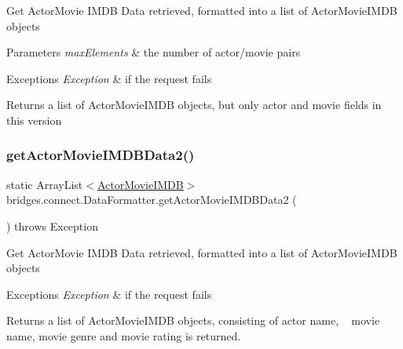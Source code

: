 Get Actor\+Movie I\+M\+DB Data retrieved, formatted into a list of Actor\+Movie\+I\+M\+DB objects


\begin{DoxyParams}{Parameters}
{\em max\+Elements} & the number of actor/movie pairs \\
\hline
\end{DoxyParams}

\begin{DoxyExceptions}{Exceptions}
{\em Exception} & if the request fails\\
\hline
\end{DoxyExceptions}
\begin{DoxyReturn}{Returns}
a list of Actor\+Movie\+I\+M\+DB objects, but only actor and movie fields in this version 
\end{DoxyReturn}
\mbox{\label{classbridges_1_1connect_1_1_data_formatter_a9b599616c4d7a502f9fab8663173db6d}} 
\subsubsection{\texorpdfstring{get\+Actor\+Movie\+I\+M\+D\+B\+Data2()}{getActorMovieIMDBData2()}}
{\footnotesize\ttfamily static Array\+List$<$\mbox{\hyperlink{classbridges_1_1data__src__dependent_1_1_actor_movie_i_m_d_b}{Actor\+Movie\+I\+M\+DB}}$>$ bridges.\+connect.\+Data\+Formatter.\+get\+Actor\+Movie\+I\+M\+D\+B\+Data2 (\begin{DoxyParamCaption}{ }\end{DoxyParamCaption}) throws Exception\hspace{0.3cm}{\ttfamily [static]}}

Get Actor\+Movie I\+M\+DB Data retrieved, formatted into a list of Actor\+Movie\+I\+M\+DB objects


\begin{DoxyExceptions}{Exceptions}
{\em Exception} & if the request fails\\
\hline
\end{DoxyExceptions}
\begin{DoxyReturn}{Returns}
a list of Actor\+Movie\+I\+M\+DB objects, consisting of actor name, ~\newline
 movie name, movie genre and movie rating is returned. 
\end{DoxyReturn}
\mbox{\label{classbridges_1_1connect_1_1_data_formatter_a3877fbdef4320f03dba7f2a6832adfbb}} 
